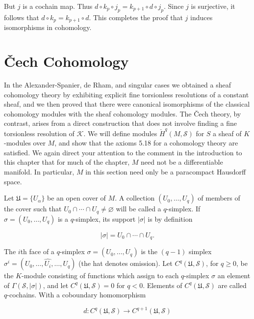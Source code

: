 But $j$ is a cochain map. Thus $d\circ k_{p}\circ j_{p}=k_{p+1}\circ d\circ j_{p}$. Since $j$ is surjective, it follows that $d\circ k_{p}=k_{p+1}\circ d$. This completes the proof that $j$ induces isomorphisms in cohomology.

\section{Čech Cohomology}


\label{thm:5.33}In the Alexander-Spanier, de Rham, and singular cases we obtained a sheaf cohomology theory by exhibiting explicit fine torsionless resolutions of a constant sheaf, and we then proved that there were canonical isomorphisms of the classical cohomology modules with the sheaf cohomology modules. The Čech theory, by contrast, arises from a direct construction that does not involve finding a fine torsionless resolution of $\mathcal{K}$. We will define modules $\check{H}^{q}(M,\mathcal{S})$ for $S$ a sheaf of $K$-modules over $M$, and show that the axioms 5.18 for a cohomology theory are satisfied. We again direct your attention to the comment in the introduction to this chapter that for much of the chapter, $M$ need not be a differentiable manifold. In particular, $M$ in this section need only be a paracompact Hausdorff space.

Let $\mathfrak{U} = \{U_\alpha\}$ be an open cover of $M$. A collection $(U_0, \ldots, U_q)$ of members of the cover such that $U_0 \cap \cdots \cap U_q \neq \varnothing$ will be called a $q$-simplex. If $\sigma = (U_0, \ldots, U_q)$ is a $q$-simplex, its support $|\sigma|$ is by definition 

\begin{equation}
\tag{1}\label{eq:5.33:1}
|\sigma|=U_{0}\cap\cdots\cap U_{q}.
\end{equation}

The $i$th face of a $q$-simplex $\sigma = (U_0, \ldots, U_q)$ is the $(q-1)$ simplex $\sigma^i = (U_0,\ldots,\widehat{U_i},\ldots,U_q)$ (the hat denotes omission). Let $C^q(\mathfrak{U},\mathcal{S})$, for $q \geq 0$, be the $K$-module consisting of functions which assign to each $q$-simplex $\sigma$ an element of $\Gamma(\mathcal{S},|\sigma|)$, and let $C^q(\mathfrak{U},\mathcal{S}) = 0$ for $q < 0$. Elements of $C^q(\mathfrak{U},\mathcal{S})$ are called $q$-cochains. With a coboundary homomorphism

\begin{equation}
\tag{2}\label{eq:5.33:2}
d\colon C^{q}(\mathfrak{U},\mathcal{S})\to C^{q+1}(\mathfrak{U},\mathcal{S})
\end{equation}

